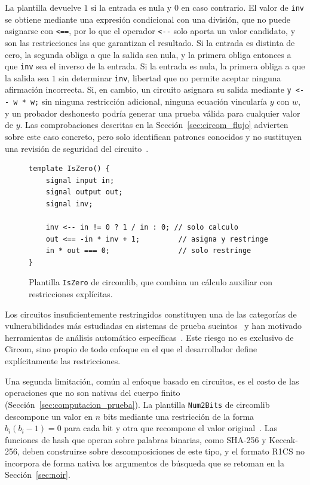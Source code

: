 La plantilla devuelve $1$ si la entrada es nula y $0$ en caso contrario. El valor de
\texttt{inv} se obtiene mediante una expresión condicional con una división, que no puede
asignarse con \lstinline|<==|, por lo que el operador \lstinline|<--| solo aporta un valor
candidato, y son las restricciones las que garantizan el resultado. Si la entrada es distinta
de cero, la segunda obliga a que la salida sea nula, y la primera obliga entonces a que
\texttt{inv} sea el inverso de la entrada. Si la entrada es nula, la primera obliga a que la
salida sea $1$ sin determinar \texttt{inv}, libertad que no permite aceptar ninguna afirmación
incorrecta. Si, en cambio, un circuito asignara su salida mediante \lstinline|y <-- w * w;| sin
ninguna restricción adicional, ninguna ecuación vincularía $y$ con $w$, y un probador deshonesto
podría generar una prueba válida para cualquier valor de $y$. Las comprobaciones descritas en la
Sección~\ref{sec:circom_flujo} advierten sobre este caso concreto, pero solo identifican patrones
conocidos y no sustituyen una revisión de seguridad del circuito~\cite{circomdocs}.

\begin{figure}[htbp]
	\centering
	\begin{minipage}{0.8\textwidth}
		\begin{lstlisting}[language=Circom]
template IsZero() {
    signal input in;
    signal output out;
    signal inv;

    inv <-- in != 0 ? 1 / in : 0; // solo calculo
    out <== -in * inv + 1;         // asigna y restringe
    in * out === 0;                // solo restringe
}
\end{lstlisting}
	\end{minipage}
	\caption{Plantilla \texttt{IsZero} de circomlib, que combina un cálculo auxiliar con
	restricciones explícitas.}
	\label{fig:circom_iszero}
\end{figure}

Los circuitos insuficientemente restringidos constituyen una de las categorías de
vulnerabilidades más estudiadas en sistemas de prueba sucintos~\cite{chaliasos2024sok} y han
motivado herramientas de análisis automático específicas~\cite{pailoor2023automated,
wen2024practical}. Este riesgo no es exclusivo de Circom, sino propio de todo
enfoque en el que el desarrollador define explícitamente las restricciones.

Una segunda limitación, común al enfoque basado en circuitos, es el costo de las operaciones que
no son nativas del cuerpo finito (Sección~\ref{sec:computacion_prueba}). La plantilla
\texttt{Num2Bits} de circomlib descompone un valor en $n$ bits mediante una restricción de la
forma $b_i (b_i - 1) = 0$ para cada bit y otra que recompone el valor original~\cite{circomlib}.
Las funciones de hash que operan sobre palabras binarias, como SHA-256 y Keccak-256, deben
construirse sobre descomposiciones de este tipo, y el formato R1CS no incorpora de forma nativa
los argumentos de búsqueda que se retoman en la Sección~\ref{sec:noir}.

